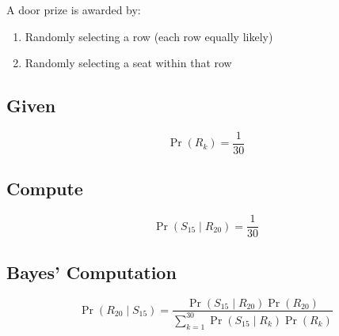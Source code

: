 \documentclass[12pt]{article}
\begin{document}
A door prize is awarded by:
\begin{enumerate}
    \item Randomly selecting a row (each row equally likely)
    \item Randomly selecting a seat within that row
\end{enumerate}

\subsection*{Given}
\[
\Pr(R_k) = \frac{1}{30}
\]

\subsection*{Compute}
\[
\Pr(S_{15} \mid R_{20}) = \frac{1}{30}
\]

\subsection*{Bayes’ Computation}
\[
\Pr(R_{20} \mid S_{15}) =
\frac{\Pr(S_{15} \mid R_{20}) \Pr(R_{20})}
{\sum_{k=1}^{30} \Pr(S_{15} \mid R_k)\Pr(R_k)}
\]
\end{document}
